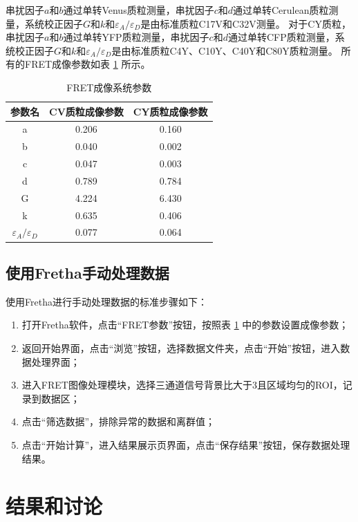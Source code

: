 串扰因子$a$和$b$通过单转Venus质粒测量，串扰因子$c$和$d$通过单转Cerulean质粒测量，系统校正因子$G$和$k$和$\varepsilon_{A}/\varepsilon_{D}$是由标准质粒C17V和C32V测量。
对于CY质粒，串扰因子$a$和$b$通过单转YFP质粒测量，串扰因子$c$和$d$通过单转CFP质粒测量，系统校正因子$G$和$k$和$\varepsilon_{A}/\varepsilon_{D}$是由标准质粒C4Y、C10Y、C40Y和C80Y质粒测量。
所有的FRET成像参数如表 \ref{tab:lurs_imaging_params} 所示。

\begin{table}[htbp]
    \centering
    \caption{FRET成像系统参数}
    \begin{tabular}{ccc}
        \toprule[1.5pt]
        参数名 & CV质粒成像参数 & CY质粒成像参数 \\
        \midrule
        a & 0.206 & 0.160\\
        b & 0.040 & 0.002\\
        c & 0.047 & 0.003\\
        d & 0.789 & 0.784\\
        G & 4.224 & 6.430\\
        k & 0.635 & 0.406\\
        $\varepsilon_{A}/\varepsilon_{D}$ & 0.077 & 0.064\\
        \bottomrule[1.5pt]
    \end{tabular}
    \label{tab:lurs_imaging_params}
\end{table}

\subsection{使用Fretha手动处理数据}
\label{sec:Fretha手动处理数据}
使用Fretha进行手动处理数据的标准步骤如下：
\begin{enumerate}
  \item 打开Fretha软件，点击“FRET参数”按钮，按照表 \ref{tab:lurs_imaging_params} 中的参数设置成像参数；
  \item 返回开始界面，点击“浏览”按钮，选择数据文件夹，点击“开始”按钮，进入数据处理界面；
  \item 进入FRET图像处理模块，选择三通道信号背景比大于3且区域均匀的ROI，记录到数据区；
  \item 点击“筛选数据”，排除异常的数据和离群值；
  \item 点击“开始计算”，进入结果展示页界面，点击“保存结果”按钮，保存数据处理结果。
\end{enumerate}

\section{结果和讨论}

